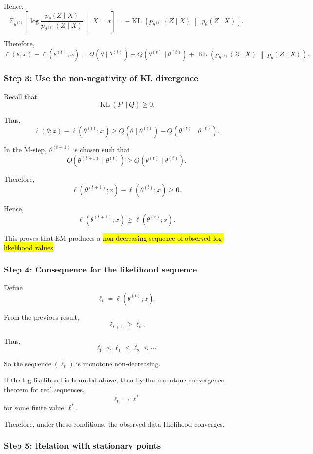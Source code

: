 Hence,
\[
\mathbb E_{\theta^{(t)}}
\left[
\log
\frac{
p_\theta(Z\mid X)
}{
p_{\theta^{(t)}}(Z\mid X)
}
\;\middle|\;
X=x
\right]
=
-
\operatorname{KL}
\left(
p_{\theta^{(t)}}(Z\mid X)
\;\middle\|\;
p_\theta(Z\mid X)
\right).
\]

Therefore,
\[
\boxed{
\ell(\theta;x)-\ell(\theta^{(t)};x)
=
Q(\theta\mid\theta^{(t)})
-
Q(\theta^{(t)}\mid\theta^{(t)})
+
\operatorname{KL}
\left(
p_{\theta^{(t)}}(Z\mid X)
\;\middle\|\;
p_\theta(Z\mid X)
\right)
}.
\]

\subsubsection*{Step 3: Use the non-negativity of KL divergence}

Recall that
\[
\operatorname{KL}(P\|Q)\geq0.
\]

Thus,
\[
\ell(\theta;x)-\ell(\theta^{(t)};x)
\geq
Q(\theta\mid\theta^{(t)})
-
Q(\theta^{(t)}\mid\theta^{(t)}).
\]

In the M-step, $\theta^{(t+1)}$ is chosen such that
\[
Q(\theta^{(t+1)}\mid\theta^{(t)})
\geq
Q(\theta^{(t)}\mid\theta^{(t)}).
\]

Therefore,
\[
\ell(\theta^{(t+1)};x)
-
\ell(\theta^{(t)};x)
\geq0.
\]

Hence,
\[
\boxed{
\ell(\theta^{(t+1)};x)
\geq
\ell(\theta^{(t)};x)
}.
\]

This proves that EM produces a
\hl{non-decreasing sequence of observed log-likelihood values}.

\subsubsection*{Step 4: Consequence for the likelihood sequence}

Define
\[
\ell_t
=
\ell(\theta^{(t)};x).
\]

From the previous result,
\[
\ell_{t+1}\geq\ell_t.
\]

Thus,
\[
\ell_0\leq\ell_1\leq\ell_2\leq\cdots.
\]

So the sequence $(\ell_t)$ is monotone non-decreasing.

If the log-likelihood is bounded above, then by the monotone
convergence theorem for real sequences,
\[
\boxed{
\ell_t\longrightarrow\ell^*
}
\]
for some finite value $\ell^*$.

Therefore, under these conditions, the observed-data likelihood
converges.

\subsubsection*{Step 5: Relation with stationary points}

